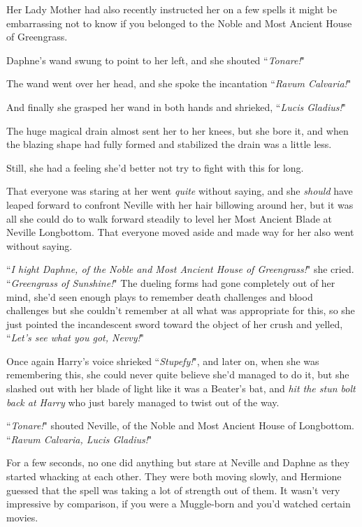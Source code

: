 Her Lady Mother had also recently instructed her on a few spells it might be embarrassing not to know if you belonged to the Noble and Most Ancient House of Greengrass.

Daphne's wand swung to point to her left, and she shouted ``\emph{Tonare!}"

The wand went over her head, and she spoke the incantation ``\emph{Ravum Calvaria!}"

And finally she grasped her wand in both hands and shrieked, ``\emph{Lucis Gladius!}"

The huge magical drain almost sent her to her knees, but she bore it, and when the blazing shape had fully formed and stabilized the drain was a little less.

Still, she had a feeling she'd better not try to fight with this for long.

That everyone was staring at her went \emph{quite} without saying, and she \emph{should} have leaped forward to confront Neville with her hair billowing around her, but it was all she could do to walk forward steadily to level her Most Ancient Blade at Neville Longbottom. That everyone moved aside and made way for her also went without saying.

``\emph{I hight Daphne, of the Noble and Most Ancient House of Greengrass!}" she cried. ``\emph{Greengrass of Sunshine!}" The dueling forms had gone completely out of her mind, she'd seen enough plays to remember death challenges and blood challenges but she couldn't remember at all what was appropriate for this, so she just pointed the incandescent sword toward the object of her crush and yelled, ``\emph{Let's see what you got, Nevvy!}"

Once again Harry's voice shrieked ``\emph{Stupefy!}", and later on, when she was remembering this, she could never quite believe she'd managed to do it, but she slashed out with her blade of light like it was a Beater's bat, and \emph{hit the stun bolt back at Harry} who just barely managed to twist out of the way.

``\emph{Tonare!}" shouted Neville, of the Noble and Most Ancient House of Longbottom. ``\emph{Ravum Calvaria, Lucis Gladius!}"

\later

For a few seconds, no one did anything but stare at Neville and Daphne as they started whacking at each other. They were both moving slowly, and Hermione guessed that the spell was taking a lot of strength out of them. It wasn't very impressive by comparison, if you were a Muggle-born and you'd watched certain movies.

